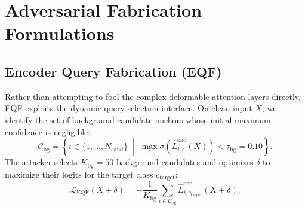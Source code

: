 \documentclass[preprint,12pt]{elsarticle}
\begin{document}
\section{Adversarial Fabrication Formulations}
\label{sec:formulations}

\subsection{Encoder Query Fabrication (EQF)}
Rather than attempting to fool the complex deformable attention layers directly, EQF exploits the dynamic query selection interface. On clean input $X$, we identify the set of background candidate anchors whose initial maximum confidence is negligible:
\begin{equation}
    \mathcal{C}_{\mathrm{bg}} = \left\{ i \in \{1,\dots,N_{\mathrm{cand}}\} \;\middle|\; \max_{c} \sigma(\hat{L}_{i, c}^{\mathrm{enc}}(X)) < \tau_{\mathrm{bg}} = 0.10 \right\}.
\end{equation}
The attacker selects $K_{\mathrm{bg}} = 50$ background candidates and optimizes $\delta$ to maximize their logits for the target class $c_{\mathrm{target}}$:
\begin{equation}
    \label{eq:eqf_loss}
    \mathcal{L}_{\mathrm{EQF}}(X + \delta) = - \frac{1}{K_{\mathrm{bg}}} \sum_{i \in \mathcal{C}_{\mathrm{bg}}} \hat{L}_{i, c_{\mathrm{target}}}^{\mathrm{enc}}(X + \delta).
\end{equation}
\end{document}
